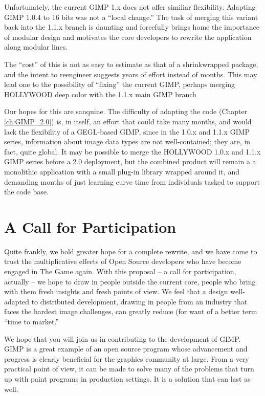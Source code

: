 Unfortunately, the current GIMP 1.x does not offer
similiar flexibility. Adapting GIMP 1.0.4 to 16
bits was not a ``local change.'' The task of
merging this variant back into the 1.1.x branch is
daunting and forcefully brings home the importance
of modular design and motivates the core
developers to rewrite the application along
modular lines.

The ``cost'' of this is not as easy to estimate 
as that of a shrinkwrapped package, and the intent
to reengineer suggests years of effort instead of
months. This may lead one to the possibility of 
``fixing'' the current GIMP, perhaps merging 
HOLLYWOOD deep color with the 1.1.x main GIMP branch

Our hopes for this are sanquine. The difficulty of
adapting the code (Chapter \ref{ch:GIMP_2.0}) is,
in itself, an effort that could take many months,
and would lack the flexibility of a GEGL-based
GIMP, since in the 1.0.x and 1.1.x GIMP series,
information about image data types are not
well-contained; they are, in fact, quite
global. It may be possible to merge the HOLLYWOOD
1.0.x and 1.1.x GIMP series before a 2.0
deployment, but the combined product will remain a
a monolithic application with a small plug-in
library wrapped around it, and demanding months of
just learning curve time from individuals tasked to
support the code base.

\section{A Call for Participation}

Quite frankly, we hold greater hope for a complete
rewrite, and we have come to trust the
multiplicative effects of Open Source developers
who have become engaged in The Game again. With
this proposal -- a call for participation, actually --
we hope to draw in people outside the current core, 
people who bring with them fresh insights and fresh
points of view. We feel that a design well-adapted to
distributed development, drawing in people from an
industry that faces the hardest image challenges, 
can greatly reduce (for want of a better term ``time
to market.''

We hope that you will join us in contributing to
the development of GIMP. GIMP is a great example
of an open source program whose advancement and
progress is clearly beneficial for the graphics
community at large. From a very practical point of
view, it can be made to solve many of the problems
that turn up with paint programs in production
settings. It is a solution that can last as well.
